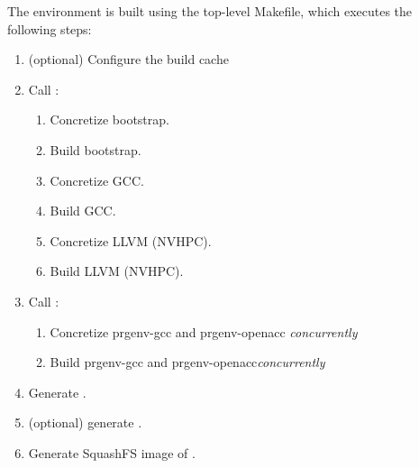 The environment is built using the top-level Makefile, which executes the following steps:
\begin{enumerate}
    \item (optional) Configure the build cache
    \item Call :
    \begin{enumerate}
        \item Concretize bootstrap.
        \item Build bootstrap.
        \item Concretize GCC.
        \item Build GCC.
        \item Concretize LLVM (NVHPC).
        \item Build LLVM (NVHPC).
    \end{enumerate}
    \item Call :
    \begin{enumerate}
        \item Concretize prgenv-gcc and prgenv-openacc \emph{concurrently}
        \item Build prgenv-gcc and prgenv-openacc\emph{concurrently}
    \end{enumerate}
    \item Generate .
    \item (optional) generate .
    \item Generate SquashFS image of .
\end{enumerate}

